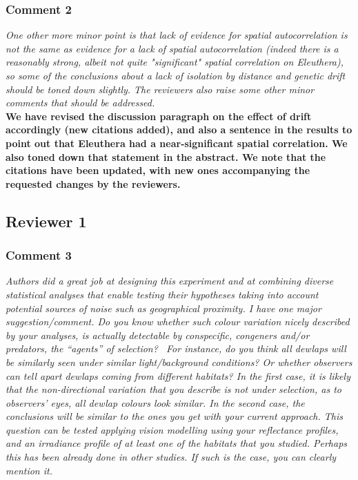 \documentclass{article}
\begin{document}
	\subsubsection*{Comment 2}
	
	\textit{One other more minor point is that lack of evidence for spatial autocorrelation is not the same as evidence for a lack of spatial autocorrelation (indeed there is a reasonably strong, albeit not quite "significant" spatial correlation on Eleuthera), so some of the conclusions about a lack of isolation by distance and genetic drift should be toned down slightly. The reviewers also raise some other minor comments that should be addressed.}\\
	
	\textbf{We have revised the discussion paragraph on the effect of drift accordingly (new citations added), and also a sentence in the results to point out that Eleuthera had a near-significant spatial correlation. We also toned down that statement in the abstract. We note that the citations have been updated, with new ones accompanying the requested changes by the reviewers.}
	
	\pagebreak
	
	\subsection*{Reviewer 1}
	
	\subsubsection*{Comment 3}
	
	\textit{Authors did a great job at designing this experiment and at combining diverse statistical analyses that enable testing their hypotheses taking into account potential sources of noise such as geographical proximity. I have one major suggestion/comment. Do you know whether such colour variation nicely described by your analyses, is actually detectable by conspecific, congeners and/or predators, the “agents” of selection?  For instance, do you think all dewlaps will be similarly seen under similar light/background conditions? Or whether observers can tell apart dewlaps coming from different habitats? In the first case, it is likely that the non-directional variation that you describe is not under selection, as to observers’ eyes, all dewlap colours look similar. In the second case, the conclusions will be similar to the ones you get with your current approach. This question can be tested applying vision modelling using your reflectance profiles, and an irradiance profile of at least one of the habitats that you studied. Perhaps this has been already done in other studies. If such is the case, you can clearly mention it.}\\
	
\end{document}
